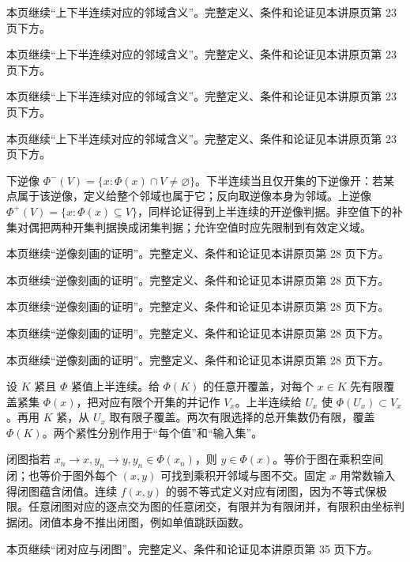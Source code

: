 本页继续“上下半连续对应的邻域含义”。完整定义、条件和论证见本讲原页第 23 页下方。

本页继续“上下半连续对应的邻域含义”。完整定义、条件和论证见本讲原页第 23 页下方。

本页继续“上下半连续对应的邻域含义”。完整定义、条件和论证见本讲原页第 23 页下方。

本页继续“上下半连续对应的邻域含义”。完整定义、条件和论证见本讲原页第 23 页下方。

下逆像 $\Phi^-(V)=\{x:\Phi(x)\cap V\ne\varnothing\}$。下半连续当且仅开集的下逆像开：若某点属于该逆像，定义给整个邻域也属于它；反向取逆像本身为邻域。上逆像 $\Phi^+(V)=\{x:\Phi(x)\subseteq V\}$，同样论证得到上半连续的开逆像判据。非空值下的补集对偶把两种开集判据换成闭集判据；允许空值时应先限制到有效定义域。

本页继续“逆像刻画的证明”。完整定义、条件和论证见本讲原页第 28 页下方。

本页继续“逆像刻画的证明”。完整定义、条件和论证见本讲原页第 28 页下方。

本页继续“逆像刻画的证明”。完整定义、条件和论证见本讲原页第 28 页下方。

本页继续“逆像刻画的证明”。完整定义、条件和论证见本讲原页第 28 页下方。

本页继续“逆像刻画的证明”。完整定义、条件和论证见本讲原页第 28 页下方。

设 $K$ 紧且 $\Phi$ 紧值上半连续。给 $\Phi(K)$ 的任意开覆盖，对每个 $x\in K$ 先有限覆盖紧集 $\Phi(x)$，把对应有限个开集的并记作 $V_x$。上半连续给 $U_x$ 使 $\Phi(U_x)\subset V_x$。再用 $K$ 紧，从 $U_x$ 取有限子覆盖。两次有限选择的总开集数仍有限，覆盖 $\Phi(K)$。两个紧性分别作用于“每个值”和“输入集”。

闭图指若 $x_n\to x,y_n\to y,y_n\in\Phi(x_n)$，则 $y\in\Phi(x)$。等价于图在乘积空间闭；也等价于图外每个 $(x,y)$ 可找到乘积开邻域与图不交。固定 $x$ 用常数输入得闭图蕴含闭值。连续 $f(x,y)$ 的弱不等式定义对应有闭图，因为不等式保极限。任意闭图对应的逐点交为图的任意闭交，有限并为有限闭并，有限积由坐标判据闭。闭值本身不推出闭图，例如单值跳跃函数。

本页继续“闭对应与闭图”。完整定义、条件和论证见本讲原页第 35 页下方。

